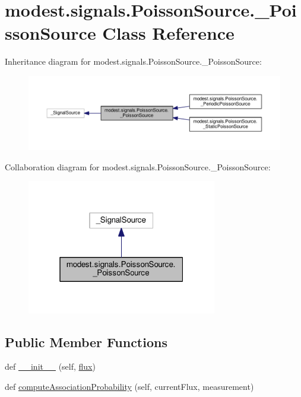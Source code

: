 \hypertarget{classmodest_1_1signals_1_1PoissonSource_1_1__PoissonSource}{}\section{modest.\+signals.\+Poisson\+Source.\+\_\+\+Poisson\+Source Class Reference}
\label{classmodest_1_1signals_1_1PoissonSource_1_1__PoissonSource}


Inheritance diagram for modest.\+signals.\+Poisson\+Source.\+\_\+\+Poisson\+Source\+:
\nopagebreak
\begin{figure}[H]
\begin{center}
\leavevmode
\includegraphics[width=350pt]{classmodest_1_1signals_1_1PoissonSource_1_1__PoissonSource__inherit__graph}
\end{center}
\end{figure}


Collaboration diagram for modest.\+signals.\+Poisson\+Source.\+\_\+\+Poisson\+Source\+:
\nopagebreak
\begin{figure}[H]
\begin{center}
\leavevmode
\includegraphics[width=235pt]{classmodest_1_1signals_1_1PoissonSource_1_1__PoissonSource__coll__graph}
\end{center}
\end{figure}
\subsection*{Public Member Functions}
\begin{DoxyCompactItemize}
\item 
def \hyperlink{classmodest_1_1signals_1_1PoissonSource_1_1__PoissonSource_a77b519c6abb90f5b13d36e2c02b90b37}{\+\_\+\+\_\+init\+\_\+\+\_\+} (self, \hyperlink{classmodest_1_1signals_1_1PoissonSource_1_1__PoissonSource_aab3036b1351c531257d2384ea0ff4ae5}{flux})
\item 
def \hyperlink{classmodest_1_1signals_1_1PoissonSource_1_1__PoissonSource_ab8100a2c9f0b5f850ff08f56e7a11cae}{compute\+Association\+Probability} (self, current\+Flux, measurement)
\end{DoxyCompactItemize}
